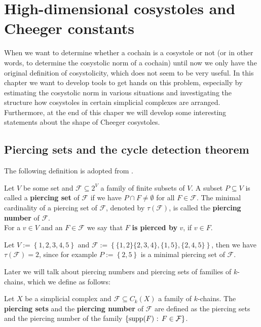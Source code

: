 
\chapter{High-dimensional cosystoles and Cheeger constants}

\label{Chapter2}

When we want to determine whether a cochain is a cosystole or not (or in other words, to determine the cosystolic norm of a cochain) until now we only have the original definition of cosystolicity, which does not seem to be very useful. In this chapter we want to develop tools to get hands on this problem, especially by estimating the cosystolic norm in various situations and investigating the structure how cosystoles in certain simplicial complexes are arranged. Furthermore, at the end of this chaper we will develop some interesting statements about the shape of Cheeger cosystoles.

\section{Piercing sets and the cycle detection theorem}

The following definition is adopted from \cite{6}.

\begin{defi}
Let \(V\) be some set and \(\mathcal{F}\subseteq 2^V\) a family of finite subsets of \(V\). A subset \(P\subseteq V\) is called a \textbf{piercing set} of \(\mathcal{F}\) if we have \(P\cap F\neq\emptyset\) for all \(F\in\mathcal{F}\). The minimal cardinality of a piercing set of \(\mathcal{F}\), denoted by \(\tau(\mathcal{F})\), is called the \textbf{piercing number} of \(\mathcal{F}\).\\
For a \(v\in V\) and an \(F\in\mathcal{F}\) we say that \(F\) \textbf{is pierced by} \(v\), if \(v\in F\).
\end{defi}

\begin{expl}\label{example1}
Let \(V:=\left\{1,2,3,4,5\right\}\) and \(\mathcal{F}:=\left\{\{1,2\}\{2,3,4\},\{1,5\},\{2,4,5\}\right\}\), then we have \(\tau(\mathcal{F})=2\), since for example \(P:=\left\{2,5\right\}\) is a minimal piercing set of \(\mathcal{F}\).
\end{expl}

Later we will talk about piercing numbers and piercing sets of families of \(k\)-chains, which we define as follows:

\begin{defi}
Let \(X\) be a simplicial complex and \(\mathcal{F}\subseteq C_k(X)\) a family of \(k\)-chains. The \textbf{piercing sets} and the \textbf{piercing number} of \(\mathcal{F}\) are defined as the piercing sets and the piercing number of the family \(\left\{\mathrm{supp}(F)\text{ : }F\in\mathcal{F}\right\}\).
\end{defi}

